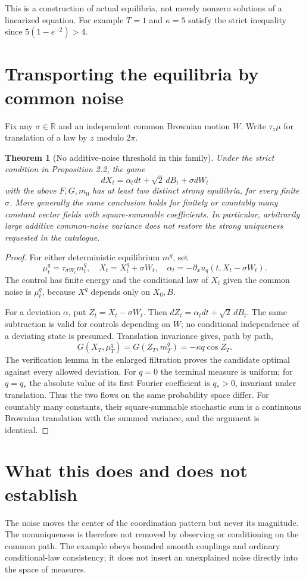 \documentclass[11pt,a4paper]{article}
\newtheorem{theorem}{Theorem}[section]
\theoremstyle{remark}
\newcommand{\R}{\mathbb R}
\begin{document}
This is a construction of actual equilibria, not merely nonzero solutions of a linearized equation. For example $T=1$ and $\kappa=5$ satisfy the strict inequality since $5(1-e^{-2})>4$.

\section{Transporting the equilibria by common noise}
Fix any $\sigma\in\R$ and an independent common Brownian motion $W$. Write $\tau_z\mu$ for translation of a law by $z$ modulo $2\pi$.

\begin{theorem}[No additive-noise threshold in this family]
Under the strict condition in Proposition 2.2, the game
\[
 dX_t=\alpha_tdt+\sqrt2\,dB_t+\sigma dW_t
\]
with the above $F,G,m_0$ has at least two distinct strong equilibria, for every finite $\sigma$. More generally the same conclusion holds for finitely or countably many constant vector fields with square-summable coefficients. In particular, arbitrarily large additive common-noise variance does not restore the strong uniqueness requested in the catalogue.
\end{theorem}
\begin{proof}
For either deterministic equilibrium $m^q$, set
\[
 \mu_t^q=\tau_{\sigma W_t}m_t^q,\quad
 X_t=X_t^q+\sigma W_t,\quad
 \alpha_t=-\partial_xu_q(t,X_t-\sigma W_t).
\]
The control has finite energy and the conditional law of $X_t$ given the common noise is $\mu_t^q$, because $X^q$ depends only on $X_0,B$.

For a deviation $\alpha$, put $Z_t=X_t-\sigma W_t$. Then $dZ_t=\alpha_tdt+\sqrt2\,dB_t$. The same subtraction is valid for controls depending on $W$; no conditional independence of a deviating state is presumed. Translation invariance gives, path by path,
\[
 G(X_T,\mu_T^q)=G(Z_T,m_T^q)=-\kappa q\cos Z_T.
\]
The verification lemma in the enlarged filtration proves the candidate optimal against every allowed deviation. For $q=0$ the terminal measure is uniform; for $q=q_*$ the absolute value of its first Fourier coefficient is $q_*>0$, invariant under translation. Thus the two flows on the same probability space differ. For countably many constants, their square-summable stochastic sum is a continuous Brownian translation with the summed variance, and the argument is identical.
\end{proof}

\section{What this does and does not establish}
The noise moves the center of the coordination pattern but never its magnitude. The nonuniqueness is therefore not removed by observing or conditioning on the common path. The example obeys bounded smooth couplings and ordinary conditional-law consistency; it does not insert an unexplained noise directly into the space of measures.
\end{document}
